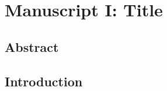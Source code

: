 \setcounter{rownumber}{0}
\singlespacing
\chapter{Manuscript I: Title}
\label{chap:chapterI}
\acresetall


% 

% 

\doublespacing


\section{Abstract}
\lipsum[2]


\section{Introduction}
\lipsum[2]

